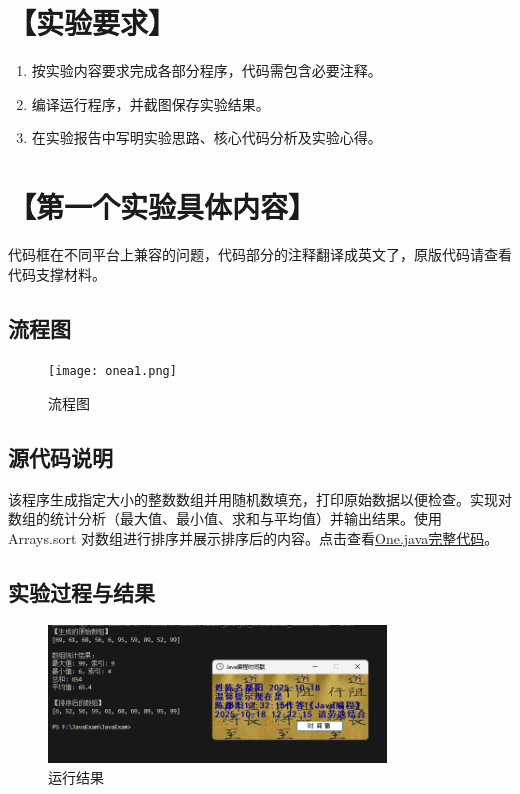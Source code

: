 \documentclass[12pt,a4paper]{article}
\begin{document}
\section*{【实验要求】}
\begin{enumerate}
    \item 按实验内容要求完成各部分程序，代码需包含必要注释。
    \item 编译运行程序，并截图保存实验结果。
    \item 在实验报告中写明实验思路、核心代码分析及实验心得。
\end{enumerate}

\section*{【第一个实验具体内容】}
代码框在不同平台上兼容的问题，代码部分的注释翻译成英文了，原版代码请查看代码支撑材料。
\subsection*{流程图}

\begin{figure}[H]
\centering
\texttt{[image: onea1.png]}
\caption{流程图}
\end{figure}

\subsection*{源代码说明}
该程序生成指定大小的整数数组并用随机数填充，打印原始数据以便检查。实现对数组的统计分析（最大值、最小值、求和与平均值）并输出结果。使用 Arrays.sort 对数组进行排序并展示排序后的内容。点击查看\hyperref[sec:one]{One.java完整代码}。

\subsection*{实验过程与结果}

\begin{figure}[H]
\centering
\includegraphics[width=0.8\textwidth,height=0.8\textheight,keepaspectratio]{onea.png}
\caption{运行结果}
\end{figure}
\end{document}
